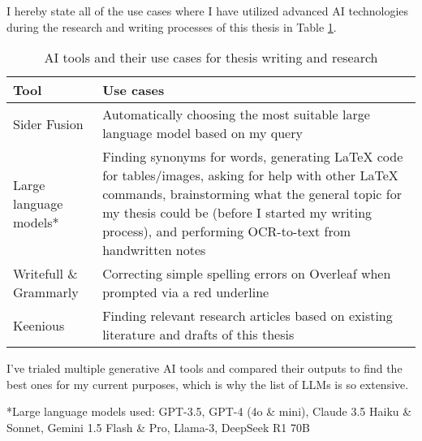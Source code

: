 

\begin{comment}
\end{comment}


I hereby state all of the use cases where I have utilized advanced AI technologies during the research and writing processes of this thesis in Table \ref{table:declaration}.


\begin{table}[ht!] 
\centering 
\renewcommand{\arraystretch}{1.5} %
\setlength{\tabcolsep}{5pt} %
\begin{tabularx}{\textwidth}{|l|X|} %
\hline  
\textbf{Tool} & \textbf{Use cases} \\ \hline  
Sider Fusion & Automatically choosing the most suitable large language model based on my query\\ \hline  
Large language models* & Finding synonyms for words, generating \LaTeX{} code for tables/images, asking for help with other \LaTeX{} commands, brainstorming what the general topic for my thesis could be (before I started my writing process), and performing OCR-to-text from handwritten notes\\ \hline  
Writefull \& Grammarly & Correcting simple spelling errors on Overleaf when prompted via a red underline\\ \hline  
Keenious & Finding relevant research articles based on existing literature and drafts of this thesis\\ \hline  
\end{tabularx}  
\caption{AI tools and their use cases for thesis writing and research}  
\label{table:declaration}  
\end{table}  

I’ve trialed multiple generative AI tools and compared their outputs to find the best ones for my current
purposes, which is why the list of LLMs is so extensive.

*Large language models used: GPT-3.5, GPT-4 (4o \& mini), Claude 3.5 Haiku \& Sonnet, Gemini 1.5 Flash \& Pro, Llama-3, DeepSeek R1 70B